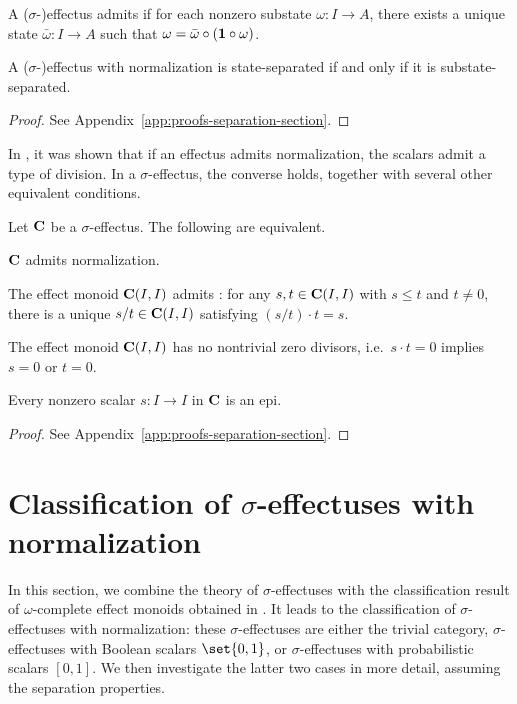 \documentclass[%
	submission,
copyright,creativecommons,UKenglish]{eptcs}
\begin{document}
\begin{definition}
A ($\sigma$-)effectus admits  if
for each nonzero substate $\omega\colon I\to A$,
there exists a unique state
$\bar{\omega}\colon I\to A$ such that
$\omega=\bar{\omega}\circ
(\mathbf{1} \circ \omega)$.
\end{definition}

\begin{proposition}
\label{prop:state-sep-equiv-substate-sep}
A ($\sigma$-)effectus with normalization
is state-separated if and only if it is substate-separated.
\end{proposition}
\begin{proof}
    See Appendix~\ref{app:proofs-separation-section}.
\end{proof}

In \cite[Proposition~6.4]{Cho2015},
it was shown that if an effectus admits normalization,
the scalars admit a type of division.
In a $\sigma$-effectus, the converse holds,
together with several other equivalent conditions.

\begin{theorem}
\label{thm:normalisation-equiv}
Let $\mathbf{C}$ be a $\sigma$-effectus.
The following are equivalent.
\begin{myenum}
\item
$\mathbf{C}$ admits normalization.
\item
The effect monoid $\mathbf{C}(I,I)$ admits :
for any $s,t\in\mathbf{C}(I,I)$ with $s\leq t$ and $t\neq 0$,
there is a unique $s/t\in \mathbf{C}(I,I)$ satisfying $(s/t)\cdot t  = s$.
\item
The effect monoid $\mathbf{C}(I,I)$ has no nontrivial zero divisors,
i.e.\ $s\cdot t=0$ implies $s=0$ or $t=0$.
\item
Every nonzero scalar $s\colon I\to I$ in $\mathbf{C}$ is an epi.
\end{myenum}
\end{theorem}
\begin{proof}
    See Appendix~\ref{app:proofs-separation-section}.
\end{proof}

\section{Classification of
\texorpdfstring{$\sigma$}{sigma}-effectuses with normalization}
\label{sec:classification}

In this section, we combine the theory of $\sigma$-effectuses
with the classification result of $\omega$-complete effect monoids
obtained in \cite{effectmonoids}.
It leads to the classification of $\sigma$-effectuses
with normalization:
these $\sigma$-effectuses are either the trivial category,
$\sigma$-effectuses with Boolean scalars $\set{0,1}$,
or $\sigma$-effectuses with probabilistic scalars $[0,1]$.
We then investigate the latter two cases in more detail,
assuming the separation properties.
\end{document}
